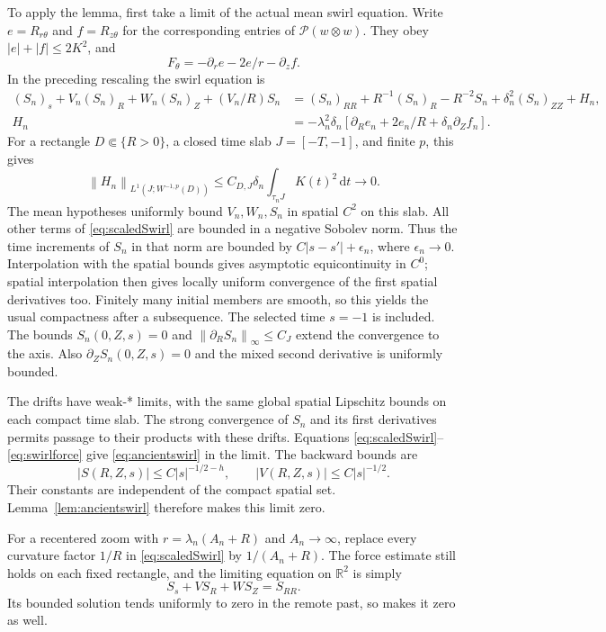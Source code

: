 \documentclass[11pt]{article}
\theoremstyle{remark}
\newcommand{\R}{\mathbb R}
\newcommand{\PP}{\mathcal P}
\newcommand{\dd}{\,\mathrm d}
\newcommand{\norm}[1]{\left\lVert#1\right\rVert}
\begin{document}
To apply the lemma, first take a limit of the actual mean swirl equation.
Write $e=R_{r\theta}$ and $f=R_{z\theta}$ for the corresponding
entries of $\PP(w\otimes w)$. They obey $|e|+|f|\leq2K^2$, and
\[
 F_\theta=-\partial_r e-2e/r-\partial_z f.
\]
In the preceding rescaling the swirl equation is
\begin{equation}\label{eq:scaledSwirl}
\begin{split}
 (S_n)_s+V_n(S_n)_R+W_n(S_n)_Z+(V_n/R)S_n
  &=(S_n)_{RR}+R^{-1}(S_n)_R-R^{-2}S_n
                       +\delta_n^2(S_n)_{ZZ}+H_n,\\
 H_n&=-\lambda_n^2\delta_n
       [\partial_R e_n+2e_n/R+\delta_n\partial_Z f_n].
\end{split}
\end{equation}
For a rectangle $D\Subset\{R>0\}$, a closed time slab
$J=[-T,-1]$, and finite $p$, this gives
\begin{equation}\label{eq:swirlforce}
 \norm{H_n}_{L^1(J;W^{-1,p}(D))}
       \leq C_{D,J}\delta_n\int_{\tau_nJ}K(t)^2\dd t
       \longrightarrow0.
\end{equation}
The mean hypotheses uniformly bound $V_n,W_n,S_n$ in spatial $C^2$
on this slab. All other terms of \eqref{eq:scaledSwirl} are bounded
in a negative Sobolev norm. Thus the time increments of $S_n$ in that
norm are bounded by $C|s-s'|+\epsilon_n$, where $\epsilon_n\to0$.
Interpolation with the spatial bounds gives asymptotic equicontinuity
in $C^0$; spatial interpolation then gives locally uniform convergence
of the first spatial derivatives too. Finitely many initial members
are smooth, so this yields the usual compactness after a subsequence.
The selected time $s=-1$ is included. The bounds $S_n(0,Z,s)=0$ and
$\norm{\partial_R S_n}_{\infty}\leq C_J$ extend the convergence
to the axis. Also $\partial_ZS_n(0,Z,s)=0$ and the mixed second
derivative is uniformly bounded.

The drifts have weak-* limits, with the same global spatial Lipschitz
bounds on each compact time slab. The strong convergence of $S_n$ and
its first derivatives permits passage to their products with these
drifts. Equations \eqref{eq:scaledSwirl}--\eqref{eq:swirlforce}
give \eqref{eq:ancientswirl} in the limit. The backward bounds are
\[
 |S(R,Z,s)|\leq C|s|^{-1/2-h},\qquad
 |V(R,Z,s)|\leq C|s|^{-1/2}.
\]
Their constants are independent of the compact spatial set.
Lemma~\ref{lem:ancientswirl} therefore makes this limit zero.

For a recentered zoom with $r=\lambda_n(A_n+R)$ and $A_n\to\infty$,
replace every curvature factor $1/R$ in \eqref{eq:scaledSwirl} by
$1/(A_n+R)$. The force estimate still holds on each fixed rectangle,
and the limiting equation on $\R^2$ is simply
\[
 S_s+V S_R+W S_Z=S_{RR}.
\]
Its bounded solution tends uniformly to zero in the remote past, so
\cite[Lemma~3.3]{CIV} makes it zero as well.
\end{document}
